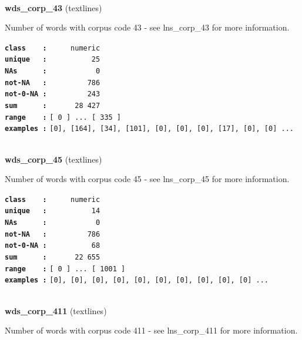 \documentclass[]{article}
\begin{document}
~

\textbf{wds\_corp\_43} (textlines)

Number of words with corpus code 43 - see lns\_corp\_43 for more
information.

\textbf{\texttt{class\ \ \ \ :}} \texttt{~~~~~numeric}\\
\textbf{\texttt{unique\ \ \ :}} \texttt{~~~~~~~~~~25}\\
\textbf{\texttt{NAs\ \ \ \ \ \ :}} \texttt{~~~~~~~~~~~0}\\
\textbf{\texttt{not-NA\ \ \ :}} \texttt{~~~~~~~~~786}\\
\textbf{\texttt{not-0-NA\ :}} \texttt{~~~~~~~~~243}\\
\textbf{\texttt{sum\ \ \ \ \ \ :}} \texttt{~~~~~~28~427}\\
\textbf{\texttt{range\ \ \ \ :}}
\texttt{{[}\ 0\ {]}\ ...\ {[}\ 335\ {]}}\\
\textbf{\texttt{examples\ :}}
\texttt{{[}0{]},\ {[}164{]},\ {[}34{]},\ {[}101{]},\ {[}0{]},\ {[}0{]},\ {[}0{]},\ {[}17{]},\ {[}0{]},\ {[}0{]}\ ...}\\

~

\textbf{wds\_corp\_45} (textlines)

Number of words with corpus code 45 - see lns\_corp\_45 for more
information.

\textbf{\texttt{class\ \ \ \ :}} \texttt{~~~~~numeric}\\
\textbf{\texttt{unique\ \ \ :}} \texttt{~~~~~~~~~~14}\\
\textbf{\texttt{NAs\ \ \ \ \ \ :}} \texttt{~~~~~~~~~~~0}\\
\textbf{\texttt{not-NA\ \ \ :}} \texttt{~~~~~~~~~786}\\
\textbf{\texttt{not-0-NA\ :}} \texttt{~~~~~~~~~~68}\\
\textbf{\texttt{sum\ \ \ \ \ \ :}} \texttt{~~~~~~22~655}\\
\textbf{\texttt{range\ \ \ \ :}}
\texttt{{[}\ 0\ {]}\ ...\ {[}\ 1001\ {]}}\\
\textbf{\texttt{examples\ :}}
\texttt{{[}0{]},\ {[}0{]},\ {[}0{]},\ {[}0{]},\ {[}0{]},\ {[}0{]},\ {[}0{]},\ {[}0{]},\ {[}0{]},\ {[}0{]}\ ...}\\

~

\textbf{wds\_corp\_411} (textlines)

Number of words with corpus code 411 - see lns\_corp\_411 for more
information.
\end{document}
